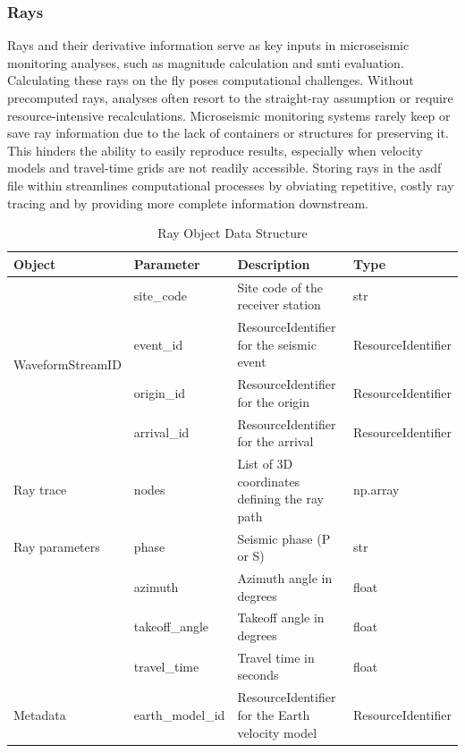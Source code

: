 \subsubsection{Rays}

Rays and their derivative information serve as key inputs in microseismic monitoring analyses, such as magnitude calculation and \gls{smti} evaluation. Calculating these rays on the fly poses computational challenges. Without precomputed rays, analyses often resort to the straight-ray assumption or require resource-intensive recalculations. Microseismic monitoring systems rarely keep or save ray information due to the lack of containers or structures for preserving it. This hinders the ability to easily reproduce results, especially when velocity models and travel-time grids are not readily accessible. Storing rays in the \gls{asdf} file within \muquake streamlines computational processes by obviating repetitive, costly ray tracing and by providing more complete information downstream.

\begin{table}[!h]
\centering
\caption{Ray Object Data Structure}
\begin{tabular}{|l|l|p{6cm}|l|}
\hline
\textbf{Object} & \textbf{Parameter} & \textbf{Description} & \textbf{Type} \\
\hline
\multirow{4}{4cm}{WaveformStreamID} & site\_code & Site code of the receiver station & str \\
                                    & event\_id & ResourceIdentifier for the seismic event & ResourceIdentifier \\
                                    & origin\_id & ResourceIdentifier for the origin & ResourceIdentifier \\
                                    & arrival\_id & ResourceIdentifier for the arrival & ResourceIdentifier \\
\hline
Ray trace & nodes & List of 3D coordinates defining the ray path & np.array \\
\hline
Ray parameters & phase & Seismic phase (P or S) & str \\
               & azimuth & Azimuth angle in degrees & float \\
               & takeoff\_angle & Takeoff angle in degrees & float \\
               & travel\_time & Travel time in seconds & float \\
\hline
Metadata & earth\_model\_id & ResourceIdentifier for the Earth velocity model & ResourceIdentifier \\
\hline
\end{tabular}
\end{table}




